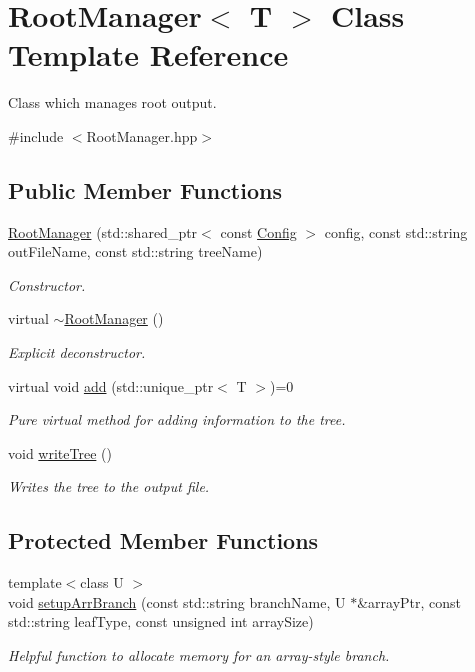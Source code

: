 \hypertarget{class_root_manager}{}\section{Root\+Manager$<$ T $>$ Class Template Reference}
\label{class_root_manager}


Class which manages root output.  




{\ttfamily \#include $<$Root\+Manager.\+hpp$>$}

\subsection*{Public Member Functions}
\begin{DoxyCompactItemize}
\item 
\hyperlink{class_root_manager_a90ff78b3122c0b3fad62bc927778dda9}{Root\+Manager} (std\+::shared\+\_\+ptr$<$ const \hyperlink{class_config}{Config} $>$ config, const std\+::string out\+File\+Name, const std\+::string tree\+Name)
\begin{DoxyCompactList}\small\item\em Constructor. \end{DoxyCompactList}\item 
virtual \hyperlink{class_root_manager_a68a189a7705b9da1da82a95ef9840d61}{$\sim$\+Root\+Manager} ()
\begin{DoxyCompactList}\small\item\em Explicit deconstructor. \end{DoxyCompactList}\item 
virtual void \hyperlink{class_root_manager_a2f05eb45d5eaee1f9f12e299395652fb}{add} (std\+::unique\+\_\+ptr$<$ T $>$)=0
\begin{DoxyCompactList}\small\item\em Pure virtual method for adding information to the tree. \end{DoxyCompactList}\item 
void \hyperlink{class_root_manager_adbe916dd56e5ec51f89c7643c4847842}{write\+Tree} ()
\begin{DoxyCompactList}\small\item\em Writes the tree to the output file. \end{DoxyCompactList}\end{DoxyCompactItemize}
\subsection*{Protected Member Functions}
\begin{DoxyCompactItemize}
\item 
{\footnotesize template$<$class U $>$ }\\void \hyperlink{class_root_manager_aa1eaed1aa026059b8d00e729161c6a43}{setup\+Arr\+Branch} (const std\+::string branch\+Name, U $\ast$\&array\+Ptr, const std\+::string leaf\+Type, const unsigned int array\+Size)
\begin{DoxyCompactList}\small\item\em Helpful function to allocate memory for an array-\/style branch. \end{DoxyCompactList}\end{DoxyCompactItemize}
